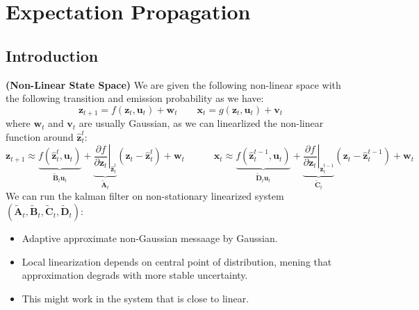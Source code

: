 \section{Expectation Propagation}

\subsection{Introduction}

\begin{remark}{\textbf{(Non-Linear State Space)}}
    We are given the following non-linear space with the following transition and emission probability as we have:
    \begin{equation*}
        \boldsymbol z_{t+1} = f(\boldsymbol z_t, \boldsymbol u_t) + \boldsymbol w_t \qquad \boldsymbol x_t = g(\boldsymbol z_t, \boldsymbol u_t) + \boldsymbol v_t
    \end{equation*}
    where $\boldsymbol w_t$ and $\boldsymbol v_t$ are usually Gaussian, as we can linearlized the non-linear function around $\hat{\boldsymbol z}_t^t$:
    \begin{equation*}
        \boldsymbol z_{t+1} \approx \underbrace{f(\hat{\boldsymbol z}_t^t, \boldsymbol u_t)}_{\tilde{\boldsymbol B}_t\boldsymbol u_t} + \underbrace{\left.\frac{\partial f}{\partial \boldsymbol z_t}\right|_{\hat{\boldsymbol z}^t_t}}_{\tilde{\boldsymbol A}_t}(\boldsymbol z_t - \hat{\boldsymbol z}^t_t) + \boldsymbol w_t \qquad\quad \boldsymbol x_{t} \approx \underbrace{f(\hat{\boldsymbol z}_{t}^{t-1}, \boldsymbol u_t)}_{\tilde{\boldsymbol D}_t\boldsymbol u_t} + \underbrace{\left.\frac{\partial f}{\partial \boldsymbol z_t}\right|_{\hat{\boldsymbol z}^{t-1}_t}}_{\tilde{\boldsymbol C}_t}(\boldsymbol z_t - \hat{\boldsymbol z}^{t-1}_t) + \boldsymbol w_t
    \end{equation*}
    We can run the kalman filter on non-stationary linearized system $( \tilde{\boldsymbol A}_t, \tilde{\boldsymbol B}_t, \tilde{\boldsymbol C}_t,\tilde{\boldsymbol D}_t )$:
    \begin{itemize}
        \item Adaptive approximate non-Gaussian messaage by Gaussian. 
        \item Local linearization depends on central point of distribution, mening that approximation degrads with more stable uncertainty. 
        \item This might work in the system that is close to linear. 
    \end{itemize}
\end{remark}

